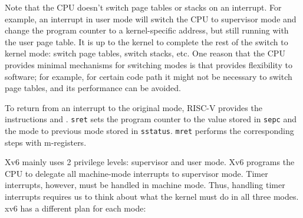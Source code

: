 Note that the CPU doesn't switch page tables or stacks on an
interrupt.  For example, an interrupt in user mode will switch the
CPU to supervisor mode and change the program counter to a
kernel-specific address, but still running with the user page table.
It is up to the kernel to complete the rest of the switch to kernel
mode: switch page tables, switch stacks, etc.  One reason that the
CPU provides minimal mechanisms for switching modes is that
provides flexibility to software; for example, for certain code path
it might not be necessary to switch page tables, and its performance
can be avoided.

To return from an interrupt to the original mode, RISC-V
provides the instructions  and
. \lstinline{sret} sets the program counter to the
value stored in \lstinline{sepc} and the mode to previous mode stored
in \lstinline{sstatus}. \lstinline{mret} performs the corresponding
steps with m-registers.

Xv6 mainly uses 2 privilege levels: supervisor and user mode.  Xv6
programs the CPU to delegate all machine-mode interrupts to
supervisor mode. Timer interrupts, however, must be handled in machine
mode.  Thus, handling timer interrupts requires us to think about what
the kernel must do in all three modes. xv6 has a different plan for
each mode:

